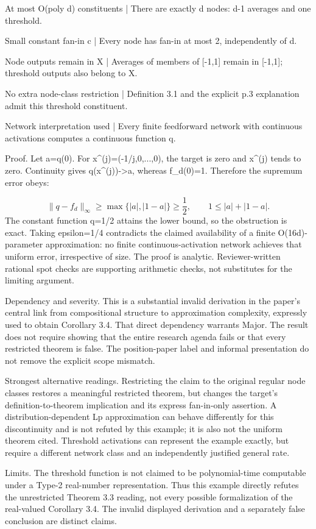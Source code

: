 \documentclass[10pt]{article}
\begin{document}
At most O(poly d) constituents | There are exactly d nodes: d-1 averages and one threshold.\par
Small constant fan-in c | Every node has fan-in at most 2, independently of d.\par
Node outputs remain in X | Averages of members of [-1,1] remain in [-1,1]; threshold outputs also belong to X.\par
No extra node-class restriction | Definition 3.1 and the explicit p.3 explanation admit this threshold constituent.\par
Network interpretation used | Every finite feedforward network with continuous activations computes a continuous function q.\par
Proof. Let a=q(0). For x\textasciicircum{}(j)=(-1/j,0,...,0), the target is zero and x\textasciicircum{}(j) tends to zero. Continuity gives q(x\textasciicircum{}(j))->a, whereas f\_d(0)=1. Therefore the supremum error obeys:\par
\[\|q-f_d\|_{\infty}\geq
\max\{|a|,|1-a|\}\geq\frac12,
\qquad 1\leq |a|+|1-a|.\] The constant function q=1/2 attains the lower bound, so the obstruction is exact. Taking epsilon=1/4 contradicts the claimed availability of a finite O(16d)-parameter approximation: no finite continuous-activation network achieves that uniform error, irrespective of size. The proof is analytic. Reviewer-written rational spot checks are supporting arithmetic checks, not substitutes for the limiting argument.\par
Dependency and severity. This is a substantial invalid derivation in the paper’s central link from compositional structure to approximation complexity, expressly used to obtain Corollary 3.4. That direct dependency warrants Major. The result does not require showing that the entire research agenda fails or that every restricted theorem is false. The position-paper label and informal presentation do not remove the explicit scope mismatch.\par
Strongest alternative readings. Restricting the claim to the original regular node classes restores a meaningful restricted theorem, but changes the target’s definition-to-theorem implication and its express fan-in-only assertion. A distribution-dependent Lp approximation can behave differently for this discontinuity and is not refuted by this example; it is also not the uniform theorem cited. Threshold activations can represent the example exactly, but require a different network class and an independently justified general rate.\par
Limits. The threshold function is not claimed to be polynomial-time computable under a Type-2 real-number representation. Thus this example directly refutes the unrestricted Theorem 3.3 reading, not every possible formalization of the real-valued Corollary 3.4. The invalid displayed derivation and a separately false conclusion are distinct claims.\par
\end{document}
